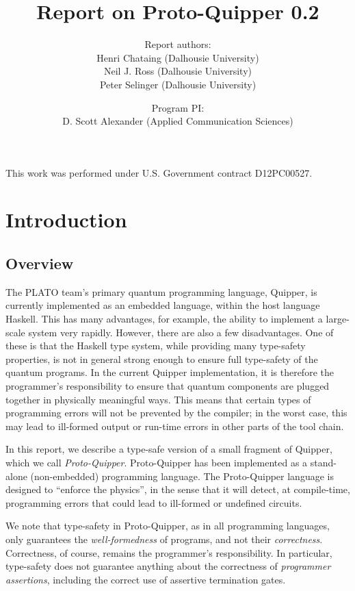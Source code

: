 \documentclass[twoside]{article}
\title{Report on Proto-Quipper 0.2}
\author{Report authors: \\
  Henri Chataing (Dalhousie University)\\
  Neil J. Ross (Dalhousie University)\\
  Peter Selinger (Dalhousie University)
}
\date{Program PI:\\
  D. Scott Alexander (Applied Communication Sciences)}
\begin{document}
\maketitle
\thispagestyle{fancy}

\vspace{-2ex}
This work was performed under U.S. Government contract D12PC00527.
\vspace{-2ex}

\tableofcontents

\clearpage
\section{Introduction}

\subsection{Overview}

The PLATO team's primary quantum programming language, Quipper, is
currently implemented as an embedded language, within the host
language Haskell. This has many advantages, for example, the ability
to implement a large-scale system very rapidly. However, there are
also a few disadvantages. One of these is that the Haskell type
system, while providing many type-safety properties, is not in general
strong enough to ensure full type-safety of the quantum programs. In
the current Quipper implementation, it is therefore the programmer's
responsibility to ensure that quantum components are plugged together
in physically meaningful ways. This means that certain types of
programming errors will not be prevented by the compiler; in the worst
case, this may lead to ill-formed output or run-time errors in other
parts of the tool chain.

In this report, we describe a type-safe version of a small fragment of
Quipper, which we call {\em Proto-Quipper}. Proto-Quipper has been
implemented as a stand-alone (non-embedded) programming language.  The
Proto-Quipper language is designed to ``enforce the physics'', in the
sense that it will detect, at compile-time, programming errors that
could lead to ill-formed or undefined circuits.  

We note that type-safety in Proto-Quipper, as in all programming
languages, only guarantees the {\em well-formedness} of programs, and
not their {\em correctness}. Correctness, of course, remains the
programmer's responsibility. In particular, type-safety does not
guarantee anything about the correctness of {\em programmer
  assertions}, including the correct use of assertive termination
gates. 
\end{document}

